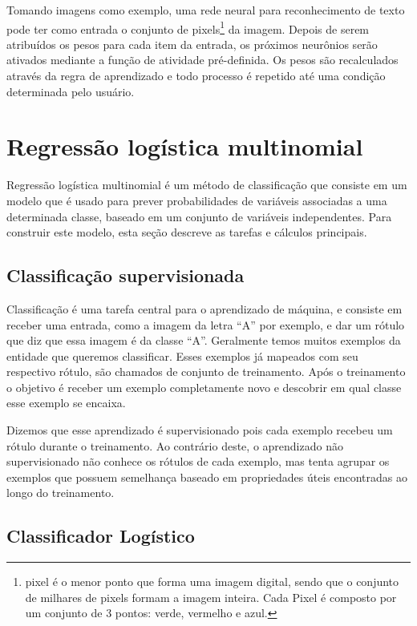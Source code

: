Tomando imagens como exemplo, uma rede neural para reconhecimento de
texto pode ter como entrada o conjunto de pixels\footnote{pixel é o
  menor ponto que forma uma imagem digital, sendo que o conjunto de
  milhares de pixels formam a imagem inteira. Cada Pixel é composto
  por um conjunto de 3 pontos: verde, vermelho e azul.} da
imagem. Depois de serem atribuídos os pesos para cada item da entrada,
os próximos neurônios serão ativados mediante a função de atividade
pré-definida. Os pesos são recalculados através da regra de
aprendizado e todo processo é repetido até uma condição determinada
pelo usuário.

\section{Regressão logística multinomial}

Regressão logística multinomial é um método de classificação que
consiste em um modelo que é usado para prever probabilidades de
variáveis associadas a uma determinada classe, baseado em um conjunto
de variáveis independentes. Para construir este modelo, esta seção
descreve as tarefas e cálculos principais.

\subsection{Classificação supervisionada}

Classificação é uma tarefa central para o aprendizado de máquina, e
consiste em receber uma entrada, como a imagem da letra ``A'' por
exemplo, e dar um rótulo que diz que essa imagem é da classe
``A''. Geralmente temos muitos exemplos da entidade que queremos
classificar. Esses exemplos já mapeados com seu respectivo rótulo, são
chamados de conjunto de treinamento. Após o treinamento o objetivo é
receber um exemplo completamente novo e descobrir em qual classe esse
exemplo se encaixa.

Dizemos que esse aprendizado é supervisionado pois cada exemplo
recebeu um rótulo durante o treinamento. Ao contrário deste, o
aprendizado não supervisionado não conhece os rótulos de cada exemplo,
mas tenta agrupar os exemplos que possuem semelhança baseado em
propriedades úteis encontradas ao longo do treinamento.

\subsection{Classificador Logístico}

